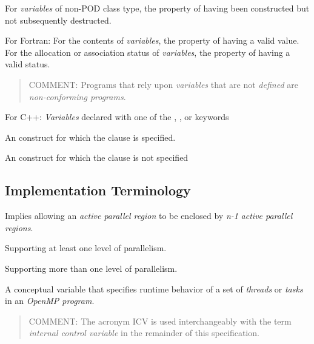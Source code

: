 For \emph{variables} of non-POD class type, the property of having been constructed but 
not subsequently destructed.

For Fortran: 
\nopagebreak
For the contents of \emph{variables}, the property of having a valid value. For the 
allocation or association status of \emph{variables}, the property of having a valid status.

\begin{quote}
COMMENT: Programs that rely upon \emph{variables} that are not \emph{defined} are \emph{non-conforming programs}.
\end{quote}
\glossarydefend

\glossarydefstart
For C++: \emph{Variables} declared with one of the , , or  keywords
\glossarydefend

\glossarydefstart
An  construct for which the  clause is specified.
\glossarydefend
\bigskip

\glossarydefstart
An  construct for which the  clause is not specified
\glossarydefend
\bigskip
\bigskip
\bigskip





\subsection{Implementation Terminology}
\label{subsec:Implementation Terminology}
\glossarydefstart
Implies allowing an \emph{active parallel region} to be enclosed by \emph{n-1} \emph{active parallel 
regions}.
\glossarydefend

\glossarydefstart
Supporting at least one level of parallelism.
\glossarydefend
\bigskip

\glossarydefstart
Supporting more than one level of parallelism.  
\glossarydefend
\bigskip

\glossarydefstart
A conceptual variable that specifies runtime behavior of a set of \emph{threads} or \emph{tasks} 
in an \emph{OpenMP program}.

\begin{quote}
COMMENT: The acronym ICV is used interchangeably with the term \emph{internal 
control variable} in the remainder of this specification.
\end{quote}
\glossarydefend

